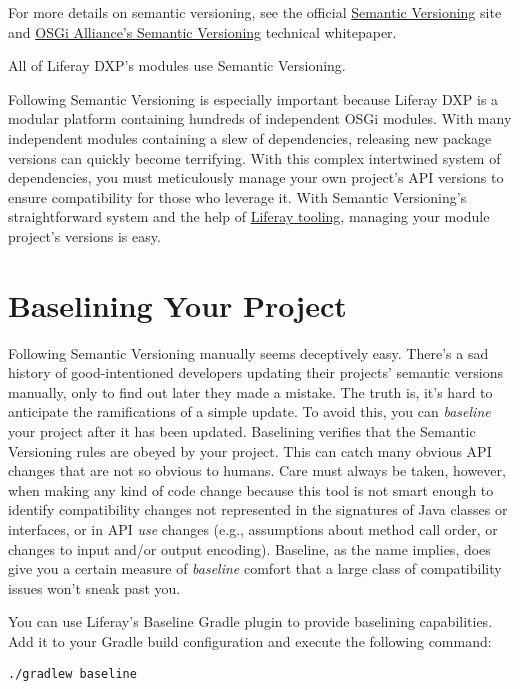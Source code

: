 For more details on semantic versioning, see the official
\href{https://semver.org/}{Semantic Versioning} site and
\href{http://www.osgi.org/wp-content/uploads/SemanticVersioning1.pdf}{OSGi
Alliance's Semantic Versioning} technical whitepaper.

All of Liferay DXP's modules use Semantic Versioning.

Following Semantic Versioning is especially important because Liferay
DXP is a modular platform containing hundreds of independent OSGi
modules. With many independent modules containing a slew of
dependencies, releasing new package versions can quickly become
terrifying. With this complex intertwined system of dependencies, you
must meticulously manage your own project's API versions to ensure
compatibility for those who leverage it. With Semantic Versioning's
straightforward system and the help of
\href{/docs/7-2/reference/-/knowledge_base/r/tooling}{Liferay tooling},
managing your module project's versions is easy.

\section{Baselining Your Project}\label{baselining-your-project}

Following Semantic Versioning manually seems deceptively easy. There's a
sad history of good-intentioned developers updating their projects'
semantic versions manually, only to find out later they made a mistake.
The truth is, it's hard to anticipate the ramifications of a simple
update. To avoid this, you can \emph{baseline} your project after it has
been updated. Baselining verifies that the Semantic Versioning rules are
obeyed by your project. This can catch many obvious API changes that are
not so obvious to humans. Care must always be taken, however, when
making any kind of code change because this tool is not smart enough to
identify compatibility changes not represented in the signatures of Java
classes or interfaces, or in API \emph{use} changes (e.g., assumptions
about method call order, or changes to input and/or output encoding).
Baseline, as the name implies, does give you a certain measure of
\emph{baseline} comfort that a large class of compatibility issues won't
sneak past you.

You can use Liferay's Baseline Gradle plugin to provide baselining
capabilities. Add it to your Gradle build configuration and execute the
following command:

\begin{verbatim}
./gradlew baseline
\end{verbatim}

